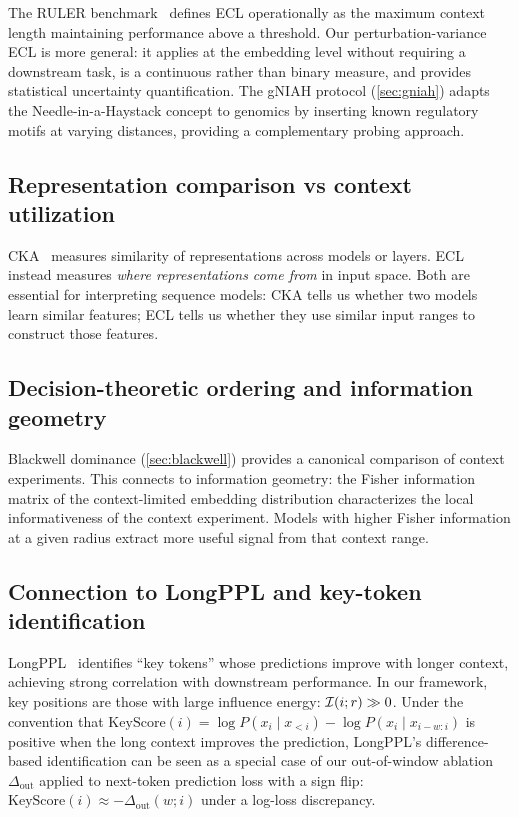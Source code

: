 The RULER benchmark~\citep{Hsieh2024RULER} defines ECL operationally as the maximum context length maintaining performance above a threshold. Our perturbation-variance ECL is more general: it applies at the embedding level without requiring a downstream task, is a continuous rather than binary measure, and provides statistical uncertainty quantification. The gNIAH protocol (\cref{sec:gniah}) adapts the Needle-in-a-Haystack concept to genomics by inserting known regulatory motifs at varying distances, providing a complementary probing approach.

\subsection{Representation comparison vs context utilization}

CKA~\citep{Kornblith2019CKA} measures similarity of representations across models or layers. ECL instead measures \emph{where representations come from} in input space. Both are essential for interpreting sequence models: CKA tells us whether two models learn similar features; ECL tells us whether they use similar input ranges to construct those features.

\subsection{Decision-theoretic ordering and information geometry}

Blackwell dominance (\cref{sec:blackwell}) provides a canonical comparison of context experiments. This connects to information geometry: the Fisher information matrix of the context-limited embedding distribution characterizes the local informativeness of the context experiment. Models with higher Fisher information at a given radius extract more useful signal from that context range.

\subsection{Connection to LongPPL and key-token identification}

LongPPL~\citep{Fang2024LongPPL} identifies ``key tokens'' whose predictions improve with longer context, achieving strong correlation with downstream performance. In our framework, key positions are those with large influence energy: $\mathcal{I}(i;r) \gg 0$. Under the convention that $\mathrm{KeyScore}(i) = \log P(x_i \mid x_{<i}) - \log P(x_i \mid x_{i-w:i})$ is positive when the long context improves the prediction, LongPPL's difference-based identification can be seen as a special case of our out-of-window ablation $\Delta_{\mathrm{out}}$ applied to next-token prediction loss with a sign flip: $\mathrm{KeyScore}(i) \approx -\Delta_{\mathrm{out}}(w; i)$ under a log-loss discrepancy.
